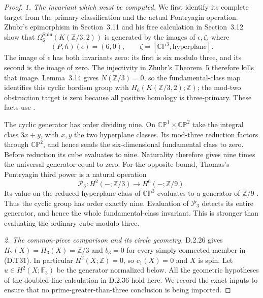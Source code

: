 \begin{proof}
\emph{1. The invariant which must be computed.}
We first identify its complete target from the primary classification
and the actual Pontryagin operation. Zhubr's epimorphism in Section~3.11
and his free calculation in Section~3.12 show that
$\Omega^{\mathrm{Spin}}_6(K(\mathbb Z/3,2))$ is generated by the
images of $\epsilon,\zeta$, where
\[
 (P,h)(\epsilon)=(6,0),\qquad
 \zeta=[\mathbb {CP}^3,\text{hyperplane}].
\]
The image of $\epsilon$ has both invariants zero: its first is six
modulo three, and its second is the image of zero. The injectivity
in Zhubr's Theorem~5 therefore kills that image.
Lemma~3.14 gives $N(\mathbb Z/3)=0$, so the fundamental-class map
identifies this cyclic bordism group with
$H_6(K(\mathbb Z/3,2);\mathbb Z)$; the mod-two obstruction target
is zero because all positive homology is three-primary.
These facts use \cite[Sections 3.11--3.14 and Theorem 5]{manZhubr75}.

The cyclic generator has order dividing nine. On
$\mathbb {CP}^1\times\mathbb {CP}^2$ take the integral class
$3x+y$, with $x,y$ the two hyperplane classes. Its mod-three
reduction factors through $\mathbb {CP}^2$, and hence sends the
six-dimensional fundamental class to zero. Before reduction its
cube evaluates to nine. Naturality therefore gives nine times the
universal generator equal to zero.
For the opposite bound, Thomas's Pontryagin third power is a natural
operation
\[
 \mathcal P_3:H^2(-;\mathbb Z/3)\longrightarrow
                              H^6(-;\mathbb Z/9).
\]
Its value on the reduced hyperplane class of $\mathbb {CP}^3$
evaluates to a generator of $\mathbb Z/9$
\cite[equation (2.8), p.267]{ffThomas56}. Thus the cyclic group has
order exactly nine. Evaluation of $\mathcal P_3$ detects its entire
generator, and hence the whole fundamental-class invariant. This is
stronger than evaluating the ordinary cube modulo three.

\emph{2. The common-piece comparison and its circle geometry.}
D.2.26 gives $H_2(X)=H_3(X)=\mathbb Z/3$ and $b_3=0$ for every
simply connected member in (D.T31). In particular $H^2(X;\mathbb Z)=0$,
so $c_1(X)=0$ and $X$ is spin. Let
$u\in H^2(X;\mathbb F_3)$ be the generator normalized below.
All the geometric hypotheses of the doubled-line calculation in
D.2.36 hold here. We record the exact inputs to ensure that no
prime-greater-than-three conclusion is being imported.


\end{proof}
